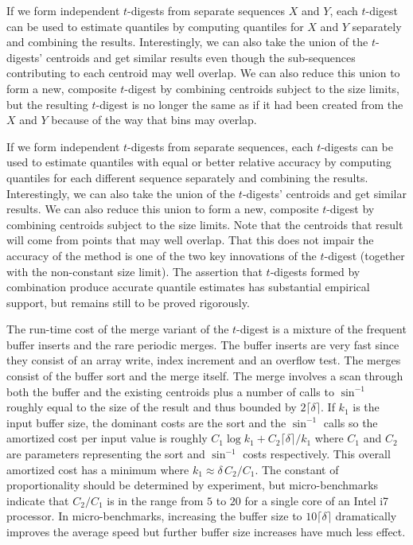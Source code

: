 \documentclass[11pt]{amsart}
\begin{document}
If we form independent $t$-digests from separate sequences $X$ and $Y$, each $t$-digest can be used to estimate quantiles by computing quantiles for $X$ and $Y$ separately and combining the results. Interestingly, we can also take the union of the $t$-digests' centroids and get similar results even though the sub-sequences contributing to each centroid may well overlap. We can also reduce this union to form a new, composite $t$-digest by combining centroids subject to the size limits, but the resulting $t$-digest is no longer the same as if it had been created from the $X$ and $Y$ because of the way that bins may overlap. 

If we form independent $t$-digests from separate sequences, each $t$-digests can be used to estimate quantiles with equal or better relative accuracy by computing quantiles for each different sequence separately and combining the results. Interestingly, we can also take the union of the $t$-digests' centroids and get similar results. We can also reduce this union to form a new, composite $t$-digest by combining centroids subject to the size limits. Note that the centroids that result will come from points that may well overlap. That this does not impair the accuracy of the method is one of the two key innovations of the $t$-digest (together with the non-constant size limit). The assertion that $t$-digests formed by combination produce accurate quantile estimates has substantial empirical support, but remains still to be proved rigorously.


The run-time cost of the merge variant of the $t$-digest is a mixture of the frequent buffer inserts  and the rare periodic merges. The buffer inserts are very fast since they consist of an array write, index increment and an overflow test. The merges consist of the buffer sort and the merge itself. The merge involves a scan through both the buffer and the existing centroids plus a number of calls to $\sin^{-1}$ roughly equal to the size of the result and thus bounded by $2 \lceil \delta \rceil$. If $k_1$ is the input buffer size, the dominant costs are the sort and the $\sin^{-1}$ calls so the amortized cost per input value is roughly $C_1 \log k_1 + C_2 \lceil \delta \rceil / k_1$ where $C_1$ and $C_2$ are parameters representing the sort and $\sin^{-1}$ costs respectively. This overall amortized cost has a minimum where $k_1 \approx \delta\, C_2  / C_1$. The constant of proportionality should be determined by experiment, but micro-benchmarks indicate that $C_2 / C_1$ is in the range from $5$ to $20$ for a single core of an Intel i7 processor. In micro-benchmarks, increasing the buffer size to $10 \lceil \delta \rceil$ dramatically improves the average speed but further buffer size increases have much less effect.
\end{document}
